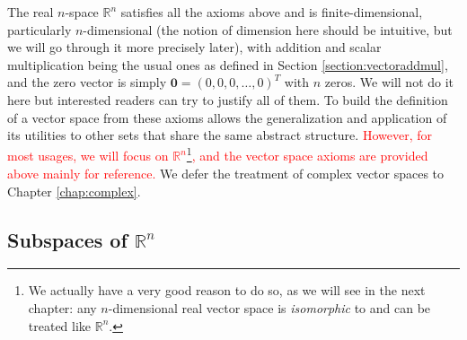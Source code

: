 The real $n$-space $\mathbb{R}^n$ satisfies all the axioms above and is finite-dimensional, particularly $n$-dimensional (the notion of dimension here should be intuitive, but we will go through it more precisely later), with addition and scalar multiplication being the usual ones as defined in Section \ref{section:vectoraddmul}, and the zero vector is simply $\textbf{0} = (0,0,0,\ldots,0)^T$ with $n$ zeros. We will not do it here but interested readers can try to justify all of them. To build the definition of a vector space from these axioms allows the generalization and application of its utilities to other sets that share the same abstract structure. \textcolor{red}{However, for most usages, we will focus on $\mathbb{R}^n$\footnote{We actually have a very good reason to do so, as we will see in the next chapter: any $n$-dimensional real vector space is \textit{isomorphic} to and can be treated like $\mathbb{R}^n$.}, and the vector space axioms are provided above mainly for reference.} We defer the treatment of complex vector spaces to Chapter \ref{chap:complex}.

\subsection{Subspaces of $\mathbb{R}^n$}
\label{section:Rnsubspace}

